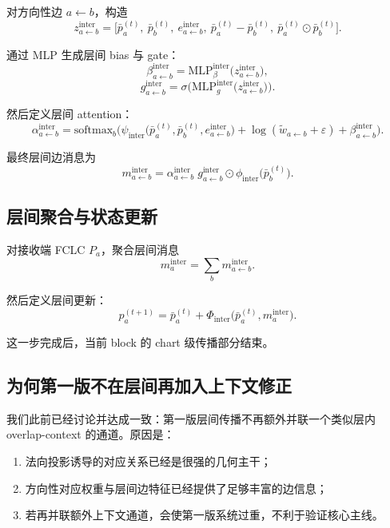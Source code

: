 \documentclass[12pt,a4paper]{ctexart}
\begin{document}
对方向性边 \(a\leftarrow b\)，构造
\[
z_{a\leftarrow b}^{\mathrm{inter}}
=
\Big[
\bar p_a^{(t)},\
\bar p_b^{(t)},\
e_{a\leftarrow b}^{\mathrm{inter}},\
\bar p_a^{(t)}-\bar p_b^{(t)},\
\bar p_a^{(t)}\odot\bar p_b^{(t)}
\Big].
\]

通过 MLP 生成层间 bias 与 gate：
\[
\beta_{a\leftarrow b}^{\mathrm{inter}}
=
\mathrm{MLP}_{\beta}^{\mathrm{inter}}
\big(
z_{a\leftarrow b}^{\mathrm{inter}}
\big),
\]
\[
g_{a\leftarrow b}^{\mathrm{inter}}
=
\sigma\Big(
\mathrm{MLP}_{g}^{\mathrm{inter}}
\big(
z_{a\leftarrow b}^{\mathrm{inter}}
\big)
\Big).
\]

然后定义层间 attention：
\[
\alpha_{a\leftarrow b}^{\mathrm{inter}}
=
\mathrm{softmax}_{b}
\Big(
\psi_{\mathrm{inter}}
\big(
\bar p_a^{(t)},
\bar p_b^{(t)},
e_{a\leftarrow b}^{\mathrm{inter}}
\big)
+
\log(\tilde w_{a\leftarrow b}+\varepsilon)
+
\beta_{a\leftarrow b}^{\mathrm{inter}}
\Big).
\]

最终层间边消息为
\[
m_{a\leftarrow b}^{\mathrm{inter}}
=
\alpha_{a\leftarrow b}^{\mathrm{inter}}
\;
g_{a\leftarrow b}^{\mathrm{inter}}
\odot
\phi_{\mathrm{inter}}
\big(
\bar p_b^{(t)}
\big).
\]

\subsection{层间聚合与状态更新}

对接收端 FCLC \(P_a\)，聚合层间消息
\[
m_a^{\mathrm{inter}}
=
\sum_b m_{a\leftarrow b}^{\mathrm{inter}}.
\]

然后定义层间更新：
\[
p_a^{(t+1)}
=
\bar p_a^{(t)}
+
\Phi_{\mathrm{inter}}
\big(
\bar p_a^{(t)},
m_a^{\mathrm{inter}}
\big).
\]

这一步完成后，当前 block 的 chart 级传播部分结束。

\subsection{为何第一版不在层间再加入上下文修正}

我们此前已经讨论并达成一致：第一版层间传播不再额外并联一个类似层内 overlap-context 的通道。原因是：

\begin{enumerate}[leftmargin=2em]
    \item 法向投影诱导的对应关系已经是很强的几何主干；
    \item 方向性对应权重与层间边特征已经提供了足够丰富的边信息；
    \item 若再并联额外上下文通道，会使第一版系统过重，不利于验证核心主线。
\end{enumerate}
\end{document}
